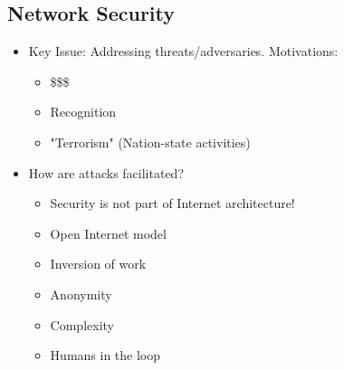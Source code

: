 \documentclass[11pt]{article}
\begin{document}
\subsection{Network Security}
\label{sec:orgheadline170}
\begin{itemize}
\item Key Issue: Addressing threats/adversaries. Motivations:
\begin{itemize}
\item \$\$\$
\item Recognition
\item "Terrorism" (Nation-state activities)
\end{itemize}
\item How are attacks facilitated?
\begin{itemize}
\item Security is not part of Internet architecture!
\item Open Internet model
\item Inversion of work
\item Anonymity
\item Complexity
\item Humans in the loop
\end{itemize}
\end{itemize}
\end{document}
